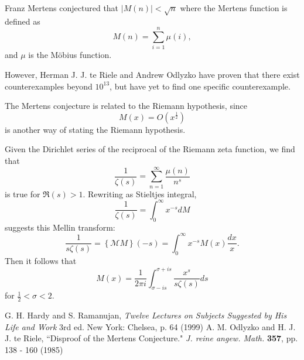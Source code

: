 \documentclass[12pt]{article}
\begin{document}
Franz Mertens conjectured that $\left| M(n) \right| < \sqrt {n}$ where the Mertens function is defined as $$M(n) = \sum_{i = 1}^n \mu(i),$$ and $\mu$ is the M\"obius function.

However, Herman J. J. te Riele and Andrew Odlyzko have proven that there exist counterexamples beyond $10^{13}$, but have yet to find one specific counterexample.

The Mertens conjecture is related to the Riemann hypothesis, since $$M(x) = O(x^\frac12)$$ is another way of stating the Riemann hypothesis.

Given the Dirichlet series of the reciprocal of the Riemann zeta function, we find that $$\frac{1}{\zeta(s)} = \sum_{n=1}^\infty \frac{\mu(n)}{n^s}$$ is true for $\Re(s) > 1$. Rewriting as Stieltjes integral, $$\frac{1}{\zeta(s)} = \int_0^{\infty} x^{-s}dM$$ suggests this Mellin transform: $$\frac{1}{s \zeta(s)} = \left\{ \mathcal{M} M \right\}(-s)
= \int_0^\infty x^{-s} M(x) \frac{dx}{x}.$$ Then it follows that $$M(x) = \frac{1}{2 \pi i} \int_{\sigma-is}^{\sigma+is} \frac{x^s}{s \zeta(s)} ds$$ for $\frac{1}{2} < \sigma < 2$.

\begin{thebibliography}{7}
 G. H. Hardy and S. Ramanujan, {\it Twelve Lectures on Subjects Suggested by His Life and Work} 3rd ed. New York: Chelsea, p. 64 (1999)
 A. M. Odlyzko and H. J. J. te Riele, ``Disproof of the Mertens Conjecture." {\it J. reine angew. Math.} {\bf 357}, pp. 138 - 160 (1985)


\end{thebibliography}
\end{document}
